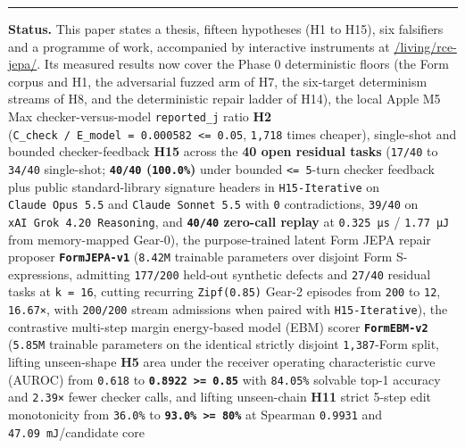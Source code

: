 \documentclass[10pt,letterpaper]{article}
\begin{document}
{
\small
\setcounter{tocdepth}{2}
\tableofcontents
}
\vspace{4pt}
\hrule
\vspace{8pt}

\textbf{Status.} This paper states a thesis, fifteen hypotheses (H1 to
H15), six falsifiers and a programme of work, accompanied by interactive
instruments at
\href{https://research.openie.dev/living/rce-jepa/}{/living/rce-jepa/}.
Its measured results now cover the Phase 0 deterministic floors (the
Form corpus and H1, the adversarial fuzzed arm of H7, the six-target
determinism streams of H8, and the deterministic repair ladder of H14),
the local Apple M5 Max checker-versus-model \texttt{reported\_\allowbreak{}j} ratio
\textbf{H2}
(\texttt{C\_check\ /\ E\_model\ =\ 0.000582\ \textless{}=\ 0.05},
\texttt{1,718} times cheaper), single-shot and bounded checker-feedback
\textbf{H15} across the \textbf{40 open residual tasks} (\texttt{17/40}
to \texttt{34/40} single-shot; \textbf{\texttt{40/40}
(\texttt{100.0\%})} under bounded \texttt{\textless{}=\ 5}-turn checker
feedback plus public standard-library signature headers in
\texttt{H15-\allowbreak{}Iterative} on \texttt{Claude\ Opus\ 5.\allowbreak{}5} and
\texttt{Claude\ Sonnet\ 5.\allowbreak{}5} with \texttt{0} contradictions,
\texttt{39/40} on \texttt{xAI\ Grok\ 4.\allowbreak{}20\ Reasoning}, and
\textbf{\texttt{40/40} zero-call replay} at \texttt{0.325\ µs} /
\texttt{1.77\ µJ} from memory-mapped Gear-0), the purpose-trained latent
Form JEPA repair proposer \textbf{\texttt{FormJEPA-\allowbreak{}v1}} (\texttt{8.42M}
trainable parameters over disjoint Form S-expressions, admitting
\texttt{177/200} held-out synthetic defects and \texttt{27/40} residual
tasks at \texttt{k\ =\ 16}, cutting recurring \texttt{Zipf(\allowbreak{}0.\allowbreak{}85)} Gear-2
episodes from \texttt{200} to \texttt{12}, \texttt{16.67×}, with
\texttt{200/200} stream admissions when paired with
\texttt{H15-\allowbreak{}Iterative}), the contrastive multi-step margin energy-based
model (EBM) scorer \textbf{\texttt{FormEBM-\allowbreak{}v2}} (\texttt{5.85M}
trainable parameters on the identical strictly disjoint
\texttt{1,387}-Form split, lifting unseen-shape \textbf{H5} area under
the receiver operating characteristic curve (AUROC) from \texttt{0.618}
to \textbf{\texttt{0.8922\ \textgreater{}=\ 0.85}} with \texttt{84.05\%}
solvable top-1 accuracy and \texttt{2.39×} fewer checker calls, and
lifting unseen-chain \textbf{H11} strict 5-step edit monotonicity from
\texttt{36.0\%} to \textbf{\texttt{93.0\%\ \textgreater{}=\ 80\%}} at
Spearman \texttt{0.9931} and \texttt{47.09\ mJ}/\allowbreak{}candidate core
\end{document}
